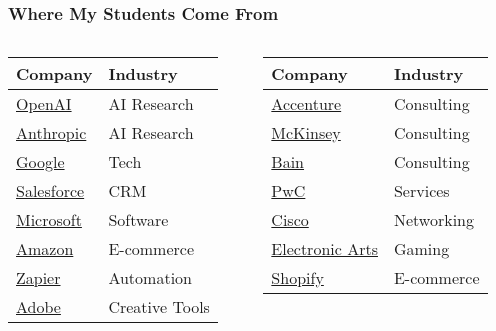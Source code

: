 {    \begin{frame}
        \frametitle{Where My Students Come From}
        \begin{columns}
            \begin{column}{0.5\textwidth}
                \begin{table}
                \small
                \begin{tabular}{ll}
                    \textbf{Company} & \textbf{Industry} \\
                    \hline
                    \textcolor{blue}{\href{https://openai.com}{OpenAI}} & AI Research \\
                    \textcolor{blue}{\href{https://anthropic.com}{Anthropic}} & AI Research \\
                    \textcolor{blue}{\href{https://google.com}{Google}} & Tech \\
                    \textcolor{blue}{\href{https://salesforce.com}{Salesforce}} & CRM \\
                    \textcolor{blue}{\href{https://microsoft.com}{Microsoft}} & Software \\
                    \textcolor{blue}{\href{https://amazon.com}{Amazon}} & E-commerce \\
                    \textcolor{blue}{\href{https://zapier.com}{Zapier}} & Automation \\
                    \textcolor{blue}{\href{https://adobe.com}{Adobe}} & Creative Tools \\
                \end{tabular}
                \end{table}
            \end{column}
            \begin{column}{0.5\textwidth}
                \begin{table}
                \small
                \begin{tabular}{ll}
                    \textbf{Company} & \textbf{Industry} \\
                    \hline
                    \textcolor{blue}{\href{https://accenture.com}{Accenture}} & Consulting \\
                    \textcolor{blue}{\href{https://mckinsey.com}{McKinsey}} & Consulting \\
                    \textcolor{blue}{\href{https://bain.com}{Bain}} & Consulting \\
                    \textcolor{blue}{\href{https://pwc.com}{PwC}} & Services \\
                    \textcolor{blue}{\href{https://cisco.com}{Cisco}} & Networking \\
                    \textcolor{blue}{\href{https://ea.com}{Electronic Arts}} & Gaming \\
                    \textcolor{blue}{\href{https://shopify.com}{Shopify}} & E-commerce \\
                \end{tabular}
                \end{table}
            \end{column}
        \end{columns}
    \end{frame}
} 